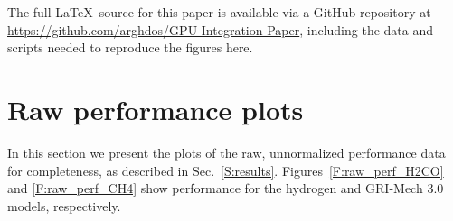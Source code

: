 \documentclass[preprint,review,11pt]{elsarticle}
\begin{document}
The full \LaTeX\ source for this paper is available via a GitHub repository at \url{https://github.com/arghdos/GPU-Integration-Paper}, including the data and scripts needed to reproduce the figures here.

\section{Raw performance plots}
\label{S:raw}

In this section we present the plots of the raw, unnormalized performance data for completeness, as described in Sec.~\ref{S:results}.
Figures~\ref{F:raw_perf_H2CO} and \ref{F:raw_perf_CH4} show performance for the hydrogen and GRI-Mech 3.0 models, respectively.
\end{document}

